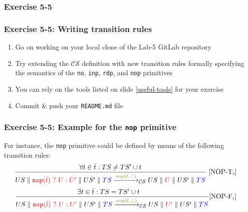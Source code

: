 \documentclass[presentation]{beamer}\mode<presentation>{\usetheme{AMSCesenaPurpleAndGold}}
\begin{document}
\subsubsection{Exercise 5-5}

\begin{frame}
\frametitle{Exercise 5-5: Writing transition rules}

    \begin{enumerate}
    \item Go on working on your local clone of the Lab-5 GitLab repository
        
        \vfill
        
        \item Try extending the $\mathcal{CS}$ definition with new transition rules formally specifying the semantics of the \texttt{no}, \texttt{inp}, \texttt{rdp}, and \texttt{nop} primitives 
        
        \vfill
        
        \item You can rely on the tools listed on slide \ref{useful-tools} for your exercise
        
        \vfill
        
        \item Commit \& push your \texttt{README.md} file
        
    \end{enumerate}

\end{frame}

\begin{frame}
\frametitle{Exercise 5-5: Example for the \texttt{nop} primitive}

    For instance, the \texttt{nop} primitive could be defined by means of the following transition rules:
    \[
		\frac{
			\forall t \in \bar{t} : TS \neq TS' \cup t
		}{
			US \parallel \highlightR{\mathtt{nop}(\bar t)\ ?\ U : U'} \parallel US' \parallel \highlightB{TS}
			\xrightarrow{\highlightG{nop(\bar t, \top)}}_\mathcal{CS}
			US \parallel \highlightR{U} \parallel US' \parallel \highlightB{TS}
		} 
		~[\text{NOP-T}_i]
	\]
    \[
		\frac{
			\exists t \in \bar{t} : TS = TS' \cup t \quad 
		}{
			US \parallel \highlightR{\mathtt{nop}(\bar t)\ ?\ U : U'} \parallel US' \parallel \highlightB{TS}
			\xrightarrow{\highlightG{nop(\bar t, \bot)}}_\mathcal{CS}
			US \parallel \highlightR{U'} \parallel US' \parallel \highlightB{TS}
		} 
		[\text{NOP-F}_i]
	\]

\end{frame}
\end{document}
